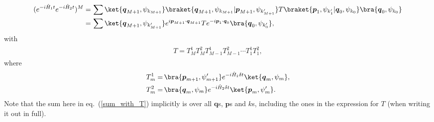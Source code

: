 \documentclass{report}
\begin{document}
%
\begin{align}
\begin{aligned}
	(e^{-i \hat H_1 t} e^{-i \hat H_2 t})^M =&\, 
		\sum 
		\ket{\boldsymbol{q}_{M+1}, \psi_{k_{M+1}}}
		\braket{\boldsymbol{q}_{M+1}, \psi_{k_{M+1}} | \boldsymbol{p}_{M+1}, \psi_{k_{M+1}'}}
		T
		\braket{\boldsymbol{p}_{1}, \psi_{k_{1}'} | \boldsymbol{q}_{0}, \psi_{k_{0}}}
		\bra{\boldsymbol{q}_{0}, \psi_{k_{0}}}\\
	=&\, 
	\sum 
	\ket{\boldsymbol{q}_{M+1}, \psi_{k_{M+1}'}}
	e^{i \boldsymbol{p}_{M+1} \cdot \boldsymbol{q}_{M+1}}
	T
	e^{-i \boldsymbol{p}_{1} \cdot \boldsymbol{q}_{0}}
	\bra{\boldsymbol{q}_{0}, \psi_{k_{0}'}},
	\label{sum_with_T}
\end{aligned}
\end{align} 
with
\begin{align}
\begin{aligned}
	T = T^1_{M}T^2_{M} T^1_{M-1}T^2_{M-1} \cdots T^1_{1}T^2_{1},
\end{aligned}
\end{align} 
where
\begin{align}
\begin{aligned}
	T^1_m =&\, 
		\bra{\boldsymbol{p}_{m+1}, \psi_{m+1}'}
			e^{-i \hat H_1 \delta t}
		\ket{\boldsymbol{q}_{m}, \psi_{m}}, \\
	T^2_m =&\, 
		\bra{\boldsymbol{q}_{m}, \psi_{m}}
			e^{-i \hat H_2 \delta t}
		\ket{\boldsymbol{p}_{m}, \psi_{m}'}.
\end{aligned}
\end{align} 
Note that the sum here in eq.\ (\ref{sum_with_T}) implicitly is over all $\boldsymbol{q}$s, $\boldsymbol{p}$s and $k$s, including the ones in the expression for $T$ (when writing it out in full).
\end{document}
